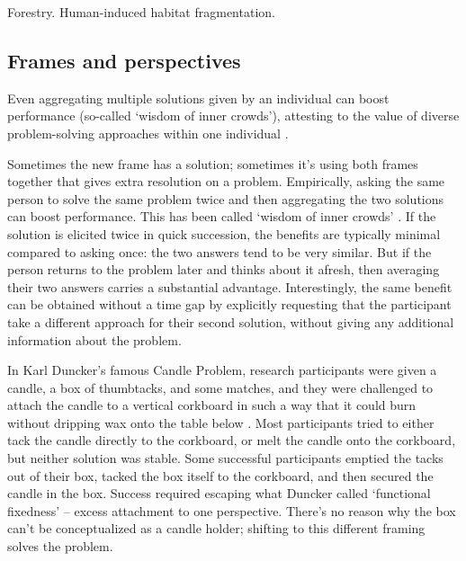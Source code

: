 Forestry. Human-induced habitat fragmentation. 

\subsection{Frames and perspectives}


Even aggregating multiple solutions given by an individual can boost performance (so-called `wisdom of inner crowds'), attesting to the value of diverse problem-solving approaches within one individual \citep{stroop1932judgment, herzog2009wisdom, herzog2014harnessing, vul2008measuring, rauhut2011wisdom}.

Sometimes the new frame has a solution; sometimes it's using both frames together that gives extra resolution on a problem. Empirically, asking the same person to solve the same problem twice and then aggregating the two solutions can boost performance. This has been called `wisdom of inner crowds' \citep{stroop1932judgment, herzog2009wisdom, herzog2014harnessing, vul2008measuring, rauhut2011wisdom}. If the solution is elicited twice in quick succession, the benefits are typically minimal compared to asking once: the two answers tend to be very similar. But if the person returns to the problem later and thinks about it afresh, then averaging their two answers carries a substantial advantage. Interestingly, the same benefit can be obtained without a time gap by explicitly requesting that the participant take a different approach for their second solution, without giving any additional information about the problem.

In Karl Duncker's famous Candle Problem, research participants were given a candle, a box of thumbtacks, and some matches, and they were challenged to attach the candle to a vertical corkboard in such a way that it could burn without dripping wax onto the table below \citep{duncker1945problem}. Most participants tried to either tack the candle directly to the corkboard, or melt the candle onto the corkboard, but neither solution was stable. Some successful participants emptied the tacks out of their box, tacked the box itself to the corkboard, and then secured the candle in the box. Success required escaping what Duncker called `functional fixedness' -- excess attachment to one perspective. There's no reason why the box can't be conceptualized as a candle holder; shifting to this different framing solves the problem.

